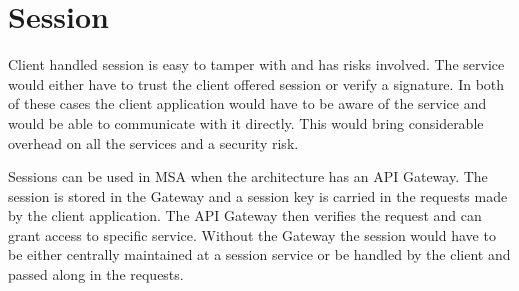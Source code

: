 

\section{Session}
\begin{sloppypar}
    Client handled session is easy to tamper with and has risks involved. The
    service would either have to trust the client offered session or verify a
    signature. In both of these cases the client application would have to be
    aware of the service and would be able to communicate with it directly. This
    would bring considerable overhead on all the services and a security risk.
\end{sloppypar}
\begin{sloppypar}
    Sessions can be used in MSA when the architecture has an API Gateway. The
    session is stored in the Gateway and a session key is carried in the
    requests made by the client application. The API Gateway then verifies the
    request and can grant access to specific service. Without the Gateway the
    session would have to be either centrally maintained at a session service or
    be handled by the client and passed along in the requests.
\end{sloppypar}




